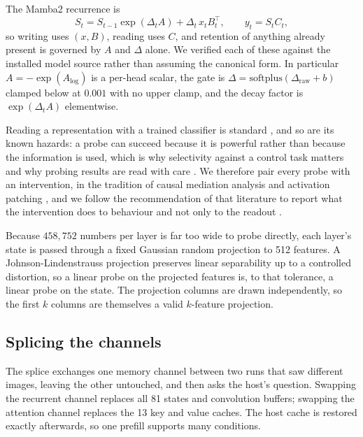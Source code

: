 \documentclass[11pt]{article}
\begin{document}
The Mamba2 recurrence is
\begin{equation}
S_t = S_{t-1}\exp(\Delta_t A) + \Delta_t\, x_t B_t^{\top},
\qquad y_t = S_t C_t ,
\end{equation}
so writing uses $(x, B)$, reading uses $C$, and retention of anything already
present is governed by $A$ and $\Delta$ alone. We verified each of these
against the installed model source rather than assuming the canonical form.
In particular $A = -\exp(A_{\log})$ is a per-head scalar, the gate is
$\Delta = \mathrm{softplus}(\Delta_{\text{raw}} + b)$ clamped below at
$0.001$ with no upper clamp, and the decay factor is
$\exp(\Delta_t A)$ elementwise.

Reading a representation with a trained classifier is standard
\cite{alain2016probes}, and so are its known hazards: a probe can succeed
because it is powerful rather than because the information is used, which is why
selectivity against a control task matters \cite{hewitt2019control} and why
probing results are read with care \cite{belinkov2022probing}. We therefore
pair every probe with an intervention, in the tradition of causal mediation
analysis \cite{vig2020causal} and activation patching
\cite{meng2022rome,wang2022ioi,zhang2024patching}, and we follow the
recommendation of that literature to report what the intervention does to
behaviour and not only to the readout \cite{zhang2024patching}.

Because $458{,}752$ numbers per layer is far too wide to probe directly, each
layer's state is passed through a fixed Gaussian random projection to 512
features. A Johnson-Lindenstrauss projection preserves linear separability up to
a controlled distortion, so a linear probe on the projected features is, to that
tolerance, a linear probe on the state. The projection columns are drawn
independently, so the first $k$ columns are themselves a valid $k$-feature
projection.

\subsection{Splicing the channels}

The splice exchanges one memory channel between two runs that saw different
images, leaving the other untouched, and then asks the host's question. Swapping
the recurrent channel replaces all 81 states and convolution buffers; swapping
the attention channel replaces the 13 key and value caches. The host cache is
restored exactly afterwards, so one prefill supports many conditions.
\end{document}
